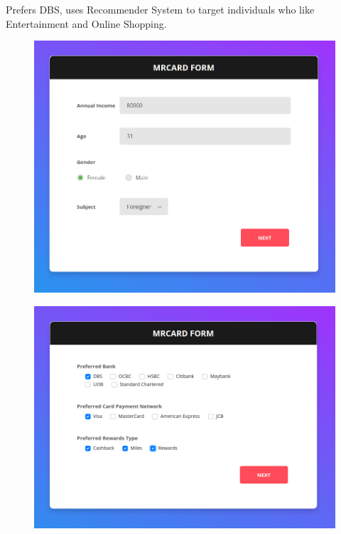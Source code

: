		Prefers DBS, uses Recommender System to target individuals who like Entertainment and Online Shopping.

		\begin{figure}[H]
			\centering
			\includegraphics[width=\linewidth]{img/scenario2_eligibility.png}
		\end{figure}

		\begin{figure}[H]
			\centering
			\includegraphics[width=\linewidth]{img/scenario2_preferences.png}
		\end{figure}

